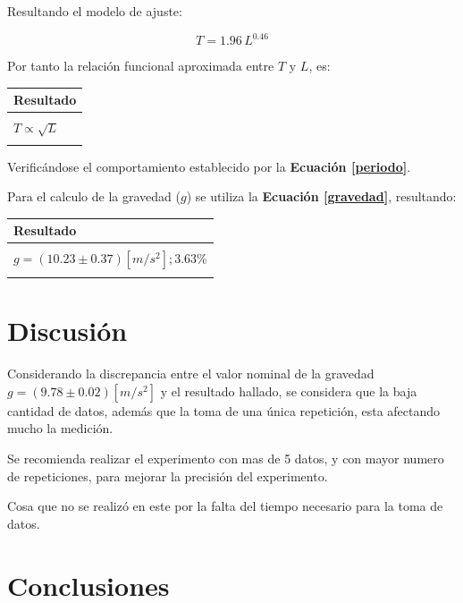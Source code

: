 \documentclass[letter,11pt]{article}
\begin{document}
Resultando el modelo de ajuste:

\begin{equation*}
    T = 1.96\,L^{0.46}
\end{equation*}
\vspace{0.10cm}

Por tanto la relación funcional aproximada entre $T$ y $L$, es:

\begin{center}
\begin{tabular}{|>{\centering}m{9.2cm}<{\centering}|}
\hline
\textbf{Resultado} 
\tabularnewline \hline
\\
$T \propto \sqrt{L}$ \tabularnewline
\\
\hline
\end{tabular}
\end{center}
\vspace{0.10cm}

Verificándose el comportamiento establecido por la
\textbf{Ecuación \ref{periodo}}.

Para el calculo de la gravedad ($g$) se utiliza la
\textbf{Ecuación \ref{gravedad}}, resultando:

\begin{center}
\begin{tabular}{|>{\centering}m{9.2cm}<{\centering}|}
\hline
\textbf{Resultado} 
\tabularnewline \hline
\\
$g = (10.23 \pm 0.37) [m/s^2]; 3.63\%$ \tabularnewline
\\
\hline
\end{tabular}
\end{center}
\vspace{0.10cm}

\section{Discusión}

Considerando la discrepancia entre el valor nominal de la gravedad 
$g = (9.78 \pm 0.02)[m/s^2]$ y el resultado hallado, se considera que la baja
cantidad de datos, además que la toma de una única repetición, esta afectando
mucho la medición.

Se recomienda realizar el experimento con mas de 5 datos, y con mayor numero de
repeticiones, para mejorar la precisión del experimento.

Cosa que no se realizó en este por la falta del tiempo necesario para la toma
de datos.

\section{Conclusiones}
\end{document}
